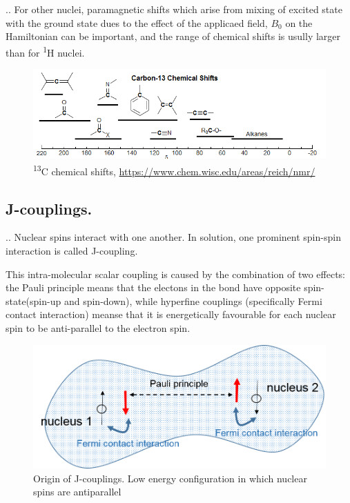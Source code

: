 \documentclass[handout]{beamer}
\begin{document}
\begin{frame}{\thesection.\thesubsection. \insertsubsection}
	For other nuclei, paramagnetic shifts which arise from mixing of excited state with the ground state dues to the effect of the applicaed field, $B_0$ on the Hamiltonian can be important, and the range of chemical shifts is usully larger than for \textsuperscript{1}H nuclei.
  \begin{figure}
  	\includegraphics[width=1.0\textwidth]{carbon_chemical_shifts.png}
  	\caption{\textsuperscript{13}C chemical shifts, \url{https://www.chem.wisc.edu/areas/reich/nmr/}}
  \end{figure}	
	
\end{frame}

\subsection{J-couplings.}
\begin{frame}{\thesection.\thesubsection. \insertsubsection}
	Nuclear spins interact with one another. In solution, one prominent spin-spin interaction is called \alert{J-coupling}.
	
	This intra-molecular scalar coupling is caused by the combination of two effects: the Pauli principle means that the electons in the bond have opposite spin-state(spin-up and spin-down), while hyperfine couplings (specifically Fermi contact interaction) meanse that it is energetically favourable for each nuclear spin to be anti-parallel to the electron spin. 
	
  \begin{figure}
  	\includegraphics[scale =0.5]{J-coupling.png}
  	\caption{Origin of J-couplings. Low energy configuration in which nuclear spins are antiparallel}
  \end{figure}	

\end{frame}
\end{document}

